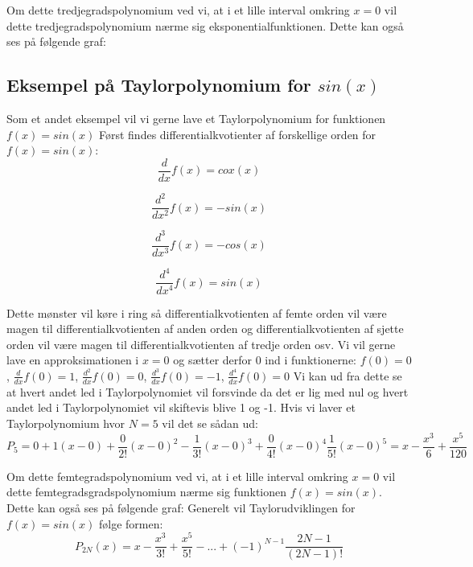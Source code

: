 Om dette tredjegradspolynomium ved vi, at i et lille interval omkring $x=0$ vil dette tredjegradspolynomium nærme sig eksponentialfunktionen. Dette kan også ses på følgende graf:

\subsection*{Eksempel på Taylorpolynomium for $sin(x)$}
Som et andet eksempel vil vi gerne lave et Taylorpolynomium for funktionen $f(x)=sin(x)$ Først findes differentialkvotienter af forskellige orden for $f(x)=sin(x)$:
\[
\frac{d}{dx}f(x)=cox(x)       
\]

\[
\frac{d^2}{dx^2}f(x)=-sin(x)
\]

\[
\frac{d^3}{dx^3}f(x)=-cos(x)
\]

\[
\frac{d^4}{dx^4}f(x)=sin(x)
\]

Dette mønster vil køre i ring så differentialkvotienten af femte orden vil være magen til differentialkvotienten af anden orden og differentialkvotienten af sjette orden vil være magen til differentialkvotienten af tredje orden osv. Vi vil gerne lave en approksimationen i $x=0$ og sætter derfor 0 ind i funktionerne:
$f(0)=0$, $\frac{d}{dx}f(0)=1$,  $\frac{d^2}{dx}f(0)=0$,                     $\frac{d^3}{dx}f(0)=-1$,    $\frac{d^4}{dx}f(0)=0$
Vi kan ud fra dette se at hvert andet led i Taylorpolynomiet vil forsvinde da det er lig med nul og hvert andet led i Taylorpolynomiet vil skiftevis blive 1 og -1. Hvis vi laver et Taylorpolynomium hvor $N=5$ vil det se sådan ud:
\[
P_5=0+1(x-0)+\frac{0}{2!}(x-0)^2-\frac{1}{3!}(x-0)^3+\frac{0}{4!}(x-0)^4\frac{1}{5!}(x-0)^5=x-\frac{x^3}{6}+\frac{x^5}{120}
\]

Om dette femtegradspolynomium ved vi, at i et lille interval omkring $x=0$ vil dette femtegradsgradspolynomium nærme sig funktionen $f(x)=sin(x)$. Dette kan også ses på følgende graf:
Generelt vil Taylorudviklingen for $f(x)=sin(x)$ følge formen:
\[
P_{2N}(x)=x-\frac{x^3}{3!}+\frac{x^5}{5!}-...+(-1)^{N-1}\frac{2N-1}{(2N-1)!}
\]


